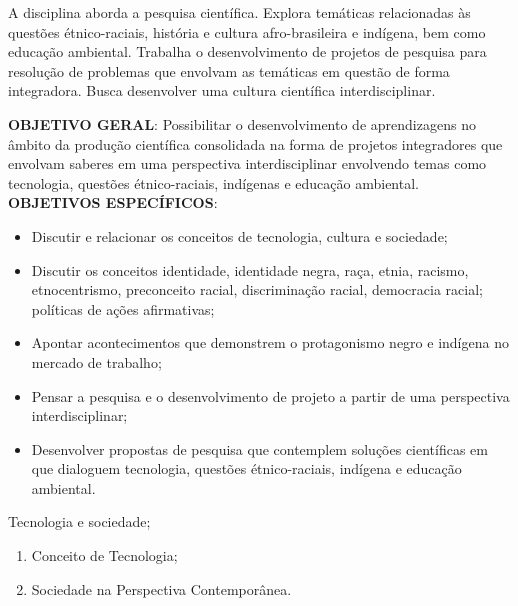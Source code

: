 \begin{pud}

	
	
	\ementa
	A disciplina aborda a pesquisa científica. Explora temáticas relacionadas às questões étnico-raciais, história e cultura afro-brasileira e indígena, bem como educação ambiental. Trabalha o desenvolvimento de projetos de pesquisa para resolução de problemas que envolvam as temáticas em questão de forma integradora. Busca desenvolver uma cultura científica interdisciplinar.
	
	\objetivos
	\textbf{OBJETIVO GERAL}:
	Possibilitar o desenvolvimento de aprendizagens no âmbito da produção científica consolidada na forma de projetos integradores que envolvam saberes em uma perspectiva interdisciplinar envolvendo temas como tecnologia, questões étnico-raciais, indígenas e educação ambiental.	
	\newline\\	
	\textbf{OBJETIVOS ESPECÍFICOS}:
	\begin{itemize}
		\item Discutir e relacionar os conceitos de tecnologia, cultura e sociedade;
        \item Discutir os conceitos identidade, identidade negra, raça, etnia, racismo, etnocentrismo, preconceito racial, discriminação racial, democracia racial; políticas de ações afirmativas; 
        \item Apontar acontecimentos que demonstrem o protagonismo negro e indígena no mercado de trabalho;
        \item Pensar a pesquisa e o desenvolvimento de projeto a partir de uma perspectiva interdisciplinar;
        \item Desenvolver propostas de pesquisa que contemplem soluções científicas em que dialoguem tecnologia, questões étnico-raciais, indígena e educação ambiental.
	\end{itemize}
	
	
	\programa
	\begin{description}[itemsep=0em]
		\item[UNIDADE I:] Tecnologia e sociedade;	 
	         \begin{enumerate}[itemsep=0em, topsep=0em]
				\item Conceito de Tecnologia;
				\item Sociedade na Perspectiva Contemporânea.
            \end{enumerate}
            

\end{description}
\end{pud}

